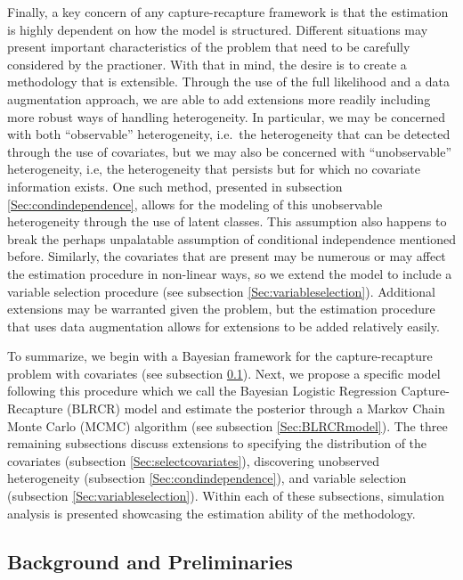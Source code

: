 \documentclass[
  12pt,
]{article}
\begin{document}
Finally, a key concern of any capture-recapture framework is that the
estimation is highly dependent on how the model is structured. Different
situations may present important characteristics of the problem that
need to be carefully considered by the practioner. With that in mind,
the desire is to create a methodology that is extensible. Through the
use of the full likelihood and a data augmentation approach, we are able
to add extensions more readily including more robust ways of handling
heterogeneity. In particular, we may be concerned with both
``observable'' heterogeneity, i.e.~the heterogeneity that can be
detected through the use of covariates, but we may also be concerned
with ``unobservable'' heterogeneity, i.e, the heterogeneity that
persists but for which no covariate information exists. One such method,
presented in subsection \ref{Sec:condindependence}, allows for the
modeling of this unobservable heterogeneity through the use of latent
classes. This assumption also happens to break the perhaps unpalatable
assumption of conditional independence mentioned before. Similarly, the
covariates that are present may be numerous or may affect the estimation
procedure in non-linear ways, so we extend the model to include a
variable selection procedure (see subsection
\ref{Sec:variableselection}). Additional extensions may be warranted
given the problem, but the estimation procedure that uses data
augmentation allows for extensions to be added relatively easily.

To summarize, we begin with a Bayesian framework for the
capture-recapture problem with covariates (see subsection
\ref{Sec:CRbackground}). Next, we propose a specific model following
this procedure which we call the Bayesian Logistic Regression
Capture-Recapture (BLRCR) model and estimate the posterior through a
Markov Chain Monte Carlo (MCMC) algorithm (see subsection
\ref{Sec:BLRCRmodel}). The three remaining subsections discuss
extensions to specifying the distribution of the covariates (subsection
\ref{Sec:selectcovariates}), discovering unobserved heterogeneity
(subsection \ref{Sec:condindependence}), and variable selection
(subsection \ref{Sec:variableselection}). Within each of these
subsections, simulation analysis is presented showcasing the estimation
ability of the methodology.

\subsection{Background and Preliminaries}
\label{Sec:CRbackground}
\end{document}
